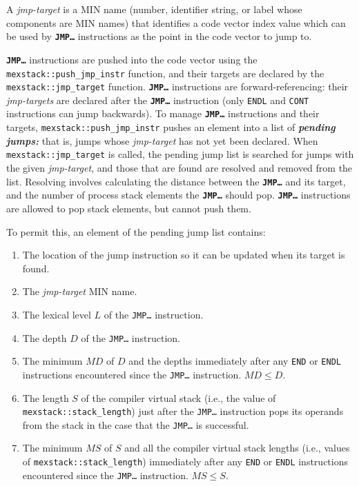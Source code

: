 \documentclass[12pt]{article}
\newcommand{\TT}[1]{{\tt \bfseries #1}}
\newcommand{\skey}[2]{{\bf \em #1#2}\index{#1}}
\begin{document}
A {\em jmp-target} is a MIN name (number, identifier string, or
label whose components are MIN names) that identifies
a code vector index value which can be used by \TT{JMP\ldots}
instructions as the point in the code vector to jump to.

\TT{JMP\ldots} instructions are pushed into the code vector
using the {\tt mexstack::push\_jmp\_instr} function, and their targets are
declared by the {\tt mexstack::jmp\_target} function.
\TT{JMP\ldots} instructions are forward-referencing: their
{\em jmp-targets} are declared after the \TT{JMP\ldots} instruction
(only {\tt ENDL} and {\tt CONT} instructions can jump backwards).
To manage \TT{JMP\ldots} instructions and their targets,
{\tt mexstack::push\_jmp\_instr}
pushes an element into a list of \skey{pending jumps}:
that is, jumps whose {\em jmp-target} has not yet been
declared.  When {\tt mexstack::jmp\_target} is called,
the pending jump list is searched for jumps with the given
{\em jmp-target},
and those that are found are resolved and removed from
the list.  Resolving involves calculating the distance
between the \TT{JMP\ldots} and its target, and the number of
process stack elements the \TT{JMP\ldots} should pop.
\TT{JMP\ldots} instructions
are allowed to pop stack elements, but cannot push them.

To permit this, an element of the pending jump list%
\label{PENDING-JUMP-LIST}
contains:
\begin{enumerate}
\item The location of the jump instruction so it can be updated
when its target is found.
\item The {\em jmp-target} MIN name.
\item The lexical level $L$ of the {\tt JMP\ldots} instruction.
\item The depth $D$ of the {\tt JMP\ldots} instruction.
\item The minimum $MD$ of $D$ and
      the depths immediately after any {\tt END} or {\tt ENDL} instructions
      encountered since the {\tt JMP\ldots} instruction.
      $MD\le D$.
\item The length $S$ of the compiler virtual stack (i.e., the value of
      {\tt mexstack::stack\_length}) just after the {\tt JMP\ldots}
      instruction pops its operands from the stack in the case that
      the {\tt JMP\ldots} is successful.
\item The minimum $MS$ of $S$ and all the compiler virtual stack lengths
      (i.e., values of {\tt mexstack::stack\_length}) immediately
      after any {\tt END} or {\tt ENDL} instructions encountered
      since the {\tt JMP\ldots} instruction.
      $MS\le S$.
\end{enumerate}
\end{document}
